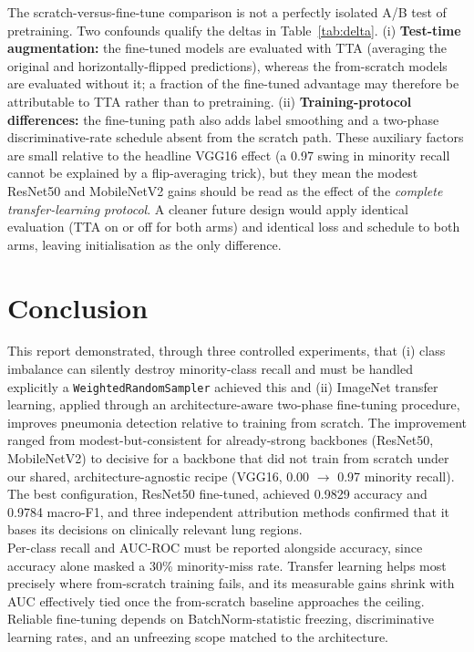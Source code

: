 \documentclass[11pt,a4paper]{article}
\numberwithin{figure}{section}
\numberwithin{table}{section}
\let\oldsection\section
\renewcommand{\section}{\clearpage\oldsection}
\begin{document}
\label{sec:threats}
The scratch-versus-fine-tune comparison is not a perfectly isolated A/B test of pretraining. Two
confounds qualify the deltas in Table~\ref{tab:delta}. (i) \textbf{Test-time augmentation:} the
fine-tuned models are evaluated with TTA (averaging the original and horizontally-flipped predictions),
whereas the from-scratch models are evaluated without it; a fraction of the fine-tuned advantage may
therefore be attributable to TTA rather than to pretraining. (ii) \textbf{Training-protocol
differences:} the fine-tuning path also adds label smoothing and a two-phase discriminative-rate schedule
absent from the scratch path. These auxiliary factors are small relative to the headline VGG16 effect (a
0.97 swing in minority recall cannot be explained by a flip-averaging trick), but they mean the modest
ResNet50 and MobileNetV2 gains should be read as the effect of the \emph{complete transfer-learning
protocol}. A cleaner future design would apply identical evaluation (TTA on or off for both arms) and
identical loss and schedule to both arms, leaving initialisation as the only difference.

\section{Conclusion}
This report demonstrated, through three controlled experiments, that (i) class imbalance can silently
destroy minority-class recall and must be handled explicitly a \texttt{WeightedRandomSampler} achieved
this and (ii) ImageNet transfer learning, applied through an architecture-aware two-phase fine-tuning
procedure, improves pneumonia detection relative to training from scratch. The improvement ranged from
modest-but-consistent for already-strong backbones (ResNet50, MobileNetV2) to decisive for a backbone
that did not train from scratch under our shared, architecture-agnostic recipe (VGG16, 0.00 $\rightarrow$
0.97 minority recall). The best configuration, ResNet50 fine-tuned, achieved 0.9829 accuracy and 0.9784
macro-F1, and three independent attribution methods confirmed that it bases its decisions on clinically
relevant lung regions.\\

Per-class recall and AUC-ROC must be reported alongside accuracy, since
accuracy alone masked a 30\% minority-miss rate. Transfer learning helps most precisely where
from-scratch training fails, and its measurable gains shrink with AUC effectively tied once the
from-scratch baseline approaches the ceiling. Reliable fine-tuning depends on BatchNorm-statistic
freezing, discriminative learning rates, and an unfreezing scope matched to the architecture.\\
\end{document}
